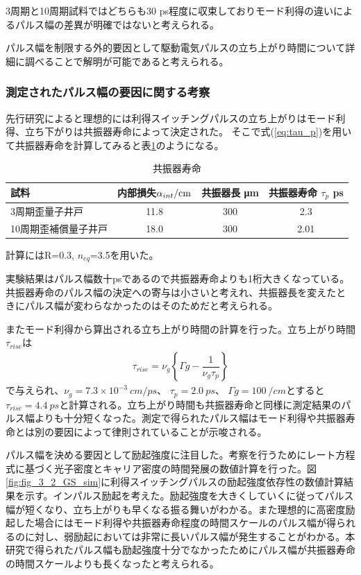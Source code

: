 {3周期と10周期試料ではどちらも30 ps程度に収束しておりモード利得の違いによるパルス幅の差異が明確ではないと考えられる。

パルス幅を制限する外的要因として駆動電気パルスの立ち上がり時間について詳細に調べることで解明が可能であると考えられる。
\subsubsection{測定されたパルス幅の要因に関する考察}
先行研究によると理想的には利得スイッチングパルスの立ち上がりはモード利得、立ち下がりは共振器寿命によって決定された。
そこで式(\ref{eq:tau_p})を用いて共振器寿命を計算してみると表\ref{table:table_taup}のようになる。
\begin{table}[h]
  \caption{共振器寿命}
  \label{table:table_taup}
  \centering
  \begin{tabular}{lccc}
    \hline
    試料   &  内部損失$\alpha_{int} \rm{ /cm}$&共振器長  \si{\micro\metre} &共振器寿命 $\tau_{p}$  ps \\
    \hline \hline
     3周期歪量子井戸 &   11.8 &300 &2.3\\
    10周期歪補償量子井戸  & 18.0 &300&2.01\\
    \hline
  \end{tabular}
\end{table}

計算にはR=0.3, $n_{eq}$=3.5を用いた。

実験結果はパルス幅数十psであるので共振器寿命よりも1桁大きくなっている。共振器寿命のパルス幅の決定への寄与は小さいと考えれ、共振器長を変えたときにパルス幅が変わらなかったのはそのためだと考えられる。

またモード利得から算出される立ち上がり時間の計算を行った。立ち上がり時間$\tau_{rise}$は
\begin{eqnarray}
\tau _{rise}=\nu _{g}\left\lbrace  \Gamma g - \dfrac{1}{\nu_{g}\tau_{p}}\right\rbrace 
\end{eqnarray}
で与えられ、$\nu_{g}=7.3\times10^{-3} \ \si{cm/ps}$\cite{ref_takashi_ito}、 $\tau_{p}=2.0 \ \si{ps}$、 $\Gamma g=100\ \si{/cm}$とすると$\tau_{rise}=4.4\ \si{ps}$と計算される。立ち上がり時間も共振器寿命と同様に測定結果のパルス幅よりも十分短くなった。測定で得られたパルス幅はモード利得や共振器寿命とは別の要因によって律則されていることが示唆される。


パルス幅を決める要因として励起強度に注目した。考察を行うためにレート方程式に基づく光子密度とキャリア密度の時間発展の数値計算を行った。図\ref{fig:fig_3_2_GS_sim}に利得スイッチングパルスの励起強度依存性の数値計算結果を示す。インパルス励起を考えた。励起強度を大きくしていくに従ってパルス幅が短くなり、立ち上がりも早くなる振る舞いがわかる。また理想的に高密度励起した場合にはモード利得や共振器寿命程度の時間スケールのパルス幅が得られるのに対し、弱励起においては非常に長いパルス幅が発生することがわかる。本研究で得られたパルス幅も励起強度十分でなかったためにパルス幅が共振器寿命の時間スケールよりも長くなったと考えられる。

}
